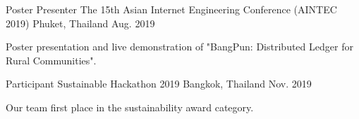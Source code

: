 

\begin{cventries}

  \cventry
    {Poster Presenter} %
    {The 15th Asian Internet Engineering Conference (AINTEC 2019)} %
    {Phuket, Thailand} %
    {Aug. 2019} %
    {
      \begin{cvitems} %
        \item { Poster presentation and live demonstration of "BangPun: Distributed Ledger for Rural Communities".}
      \end{cvitems}
    }

  \cventry
    {Participant} %
    {Sustainable Hackathon 2019} %
    {Bangkok, Thailand} %
    {Nov. 2019} %
    {
      \begin{cvitems} %
      \item { Our team first place in the sustainability award category. }
      \end{cvitems}
    }

\end{cventries}

